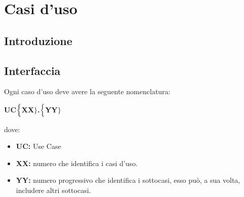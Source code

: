 \chapter{Casi d'uso}

\section{Introduzione}

\section{Interfaccia}
Ogni caso d'uso deve avere la seguente nomenclatura:

\begin{center}
	\textbf{UC$\Bigl\{$XX$\Bigr\}$.$\Bigl\{$YY$\Bigr\}$}
\end{center}
dove:
\begin{itemize}
	\item \textbf{UC:} Use Case
	\item \textbf{{XX}:} numero che identifica i casi d'uso.
	\item \textbf{{YY}:} numero progressivo che identifica i sottocasi, esso può, a sua volta, includere altri sottocasi.
\end{itemize}


\noindent{}
